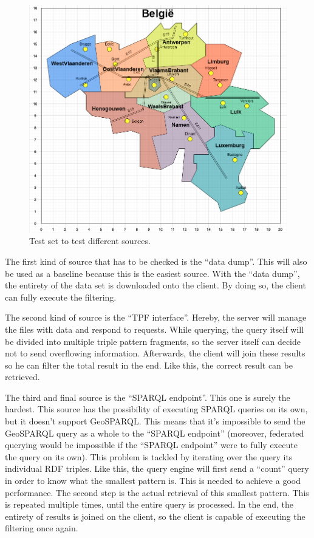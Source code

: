 \documentclass[twocolumn]{phdsymp} %
\begin{document}
\begin{figure}
    \centering
    \includegraphics[width=\linewidth]{images/geosparql_demo.png}
    \caption{Test set to test different sources.}
    \label{fig:abstr_demoset}
\end{figure}

The first kind of source that has to be checked is the ``data dump''. This will also be used as a baseline because this is the easiest source. With the ``data dump'', the entirety of the data set is downloaded onto the client. By doing so, the client can fully execute the filtering.

The second kind of source is the ``TPF interface''. Hereby, the server will manage the files with data and respond to requests. While querying, the query itself will be divided into multiple triple pattern fragments, so the server itself can decide not to send overflowing information. Afterwards, the client will join these results so he can filter the total result in the end. Like this, the correct result can be retrieved.

The third and final source is the ``SPARQL endpoint''. This one is surely the hardest. This source has the possibility of executing SPARQL queries on its own, but it doesn't support GeoSPARQL. This means that it's impossible to send the GeoSPARQL query as a whole to the ``SPARQL endpoint'' (moreover, federated querying would be impossible if the ``SPARQL endpoint'' were to fully execute the query on its own). This problem is tackled by iterating over the query its individual RDF triples. Like this, the query engine will first send a ``count'' query in order to know what the smallest pattern is. This is needed to achieve a good performance. The second step is the actual retrieval of this smallest pattern. This is repeated multiple times, until the entire query is processed. In the end, the entirety of results is joined on the client, so the client is capable of executing the filtering once again.
\end{document}
